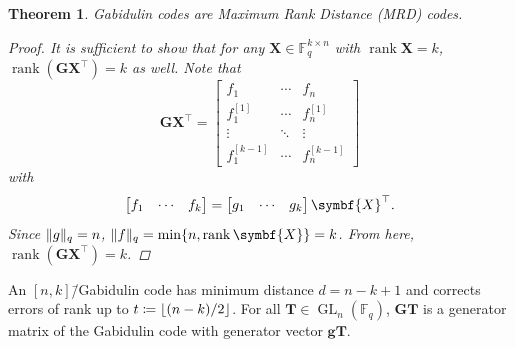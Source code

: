 \documentclass[version=last, paper=A4, parskip=half, oneside]{scrbook}
\theoremstyle{plain}
\newtheorem{theorem}{Theorem}
\theoremstyle{definition}
\theoremstyle{remark}
\renewcommand*{\vec}{\symbf}
\newcommand*{\mat}{\symbf}
\newcommand*{\trans}{\top}%
\DeclareMathOperator{\rank}{rank}
\newcommand*{\FF}{\ensuremath{\mathbb{F}}}
\DeclarePairedDelimiter{\floor}{\lfloor}{\rfloor}
\DeclarePairedDelimiter{\norm}{\lVert}{\rVert}
\newcommand*{\normR}[2]{\ensuremath{\norm{#1}_{#2}}}
\begin{document}
\begin{theorem}
  Gabidulin codes are Maximum Rank Distance (MRD) codes.
  \begin{proof}
    It is sufficient to show that for any \(\mat{X} \in \FF_{q}^{k \times n}\)
    with \(\rank \mat{X} = k\), \(\rank(\mat{G} \mat{X}^{\trans}) = k\) as well.
    Note that
    \[
      \mat{G} \mat{X}^{\trans} =
      \begin{bmatrix}
        f_1 & \cdots & f_n \\
        f_1^{[1]} & \cdots & f_n^{[1]} \\
        \vdots & \ddots & \vdots \\
        f_1^{[k - 1]} & \cdots & f_n^{[k - 1]}
      \end{bmatrix}
    \]
    with
    \[
      \begin{bmatrix}
        f_1 & \cdots & f_k
      \end{bmatrix} =
      \begin{bmatrix}
        g_1 & \cdots & g_k
      \end{bmatrix}\mat{X}^{\trans}\text.
    \]
    Since \(\normR{g}{q} = n\), \(\normR{f}{q} = \min\{n, \rank\mat{X}\} = k\).
    From here, \(\rank(\mat{G} \mat{X}^{\trans}) = k\).
\end{proof}
\end{theorem}

An \([n, k]\)\=/Gabidulin code has minimum distance \(d = n - k + 1\) and
corrects errors of rank up to \(t \coloneqq \floor{(n - k) / {2}}\).  For all
\(\mat{T} \in \operatorname{GL}_n(\FF_q)\), \(\mat{G} \mat{T}\) is a generator
matrix of the Gabidulin code with generator vector \(\vec{g} \mat{T}\).
\end{document}
